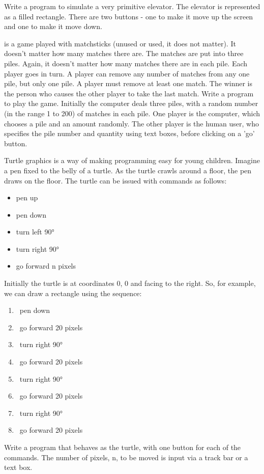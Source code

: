 \begin{EXE}
			\item	{} Write a program to simulate a very primitive elevator. The elevator is represented as a filled rectangle. There are two buttons - one to make it move up the screen and one to make it move down.
			\item {} is a game played with matchsticks (unused or used, it does not matter). It doesn't matter how many matches there are. The matches are put into three piles. Again, it doesn't matter how many matches there are in each pile. Each player goes in turn. A player can remove any number of matches from any one pile, but only one pile. A player must remove at least one match. The winner is the person who causes the other player to take the last match.
				Write a program to play the game. Initially the computer deals three piles, with a random number (in the range 1 to 200) of matches in each pile. One player is the computer, which chooses a pile and an amount randomly. The other player is the human user, who specifies the pile number and quantity using text boxes, before clicking on a 'go' button.
			\item	{} Turtle graphics is a way of making programming easy for young children. Imagine a pen fixed to the belly of a turtle. As the turtle crawls around a floor, the pen draws on the floor. The turtle can be issued with commands as follows:
				\begin{itemize}
					\item pen up
					\item pen down
					\item turn left 90°
					\item turn right 90°
					\item go forward n pixels
				\end{itemize}
				Initially the turtle is at coordinates 0, 0 and facing to the right.
				So, for example, we can draw a rectangle using the sequence:
				\begin{enumerate}
					\item pen down
					\item go forward 20 pixels
					\item turn right 90°
					\item go forward 20 pixels
					\item turn right 90°
					\item go forward 20 pixels
					\item turn right 90°
					\item go forward 20 pixels
				\end{enumerate}
				Write a program that behaves as the turtle, with one button for each of the commands. The number of pixels, n, to be moved is input via a track bar or a text box.
		\end{EXE}


